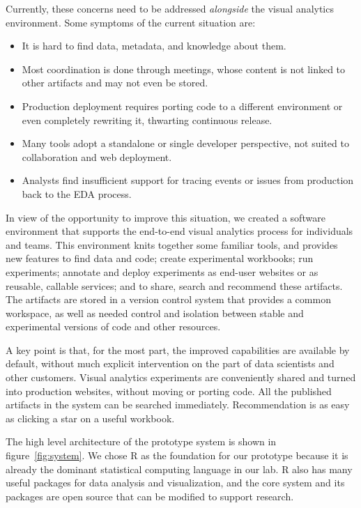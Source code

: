 Currently, these concerns need to be addressed \emph{alongside} the
visual analytics environment. Some symptoms of the current situation are:
\begin{itemize}
\item It is hard to find data, metadata, and knowledge about them.
\item Most coordination is done through meetings, whose content is not linked to other artifacts and may not even be stored.
\item Production deployment requires porting code to a different environment or even completely rewriting it, thwarting continuous release.
\item Many tools adopt a standalone or single developer perspective,
not suited to collaboration and web deployment. 
\item Analysts find insufficient support for tracing events or issues from production back to the EDA process.
\end{itemize}

In view of the opportunity to improve this situation,
we created a software environment that supports the end-to-end
visual analytics process for individuals and teams.
This environment knits together some familiar tools, and 
provides new features to find data and code; create experimental workbooks;
run experiments; annotate and deploy experiments as end-user websites or
as reusable, callable services; and to share, search and recommend these artifacts. The artifacts are stored in a version
control system that provides a common workspace, as well as needed control
and isolation between stable and experimental versions of code and other
resources. 

A key point is that, for the most part, the improved capabilities are
available by default, without much explicit intervention on the part of
data scientists and other customers. Visual analytics experiments are
conveniently shared and turned into production websites, without moving
or porting code. All the published artifacts in the system can be
searched immediately. Recommendation is as easy as clicking a star
on a useful workbook.

The high level architecture of the prototype system
is shown in figure~\ref{fig:system}.
We chose R as the foundation for our prototype because it is already
the dominant statistical computing language in our lab.
R also has many useful packages for data analysis and visualization,
and the core system and its packages are open source that can be modified to
support research. 

